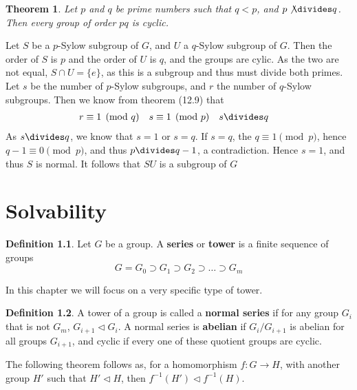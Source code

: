\documentclass[12pt]{amsbook}
\makeatletter
\theoremstyle{plain}
\newtheorem{theorem}{Theorem}[chapter]
\theoremstyle{definition}
\newtheorem{definition}{Definition}
\renewenvironment{proof}[1][\proofname]{\par
  \pushQED{\qed}%
  \normalfont \topsep6\p@\@plus6\p@\relax
  \list{}{\leftmargin=0em
          \rightmargin=\leftmargin
          \settowidth{\itemindent}{\itshape#1}%
          \labelwidth=\itemindent}

  \item[\hskip\labelsep
        \itshape
    #1\@addpunct{.}]\ignorespaces
}{%
  \popQED\endlist\@endpefalse
}
\makeatother
\begin{document}
\begin{theorem}
    Let $p$ and $q$ be prime numbers such that $q < p$, and $p \not \divides q$. Then every group of order $pq$ is cyclic.
\end{theorem}
\begin{proof}
    Let $S$ be a $p$-Sylow subgroup of $G$, and $U$ a $q$-Sylow subgroup of $G$. Then the order of $S$ is $p$ and the order of $U$ is $q$, and the groups are cylic. As the two are not equal, $S \cap U = \{ e \}$, as this is a subgroup and thus must divide both primes. Let $s$ be the number of $p$-Sylow subgroups, and $r$ the number of $q$-Sylow subgroups. Then we know from theorem (12.9) that
    \begin{align*} r &\equiv 1 \pmod{q} & s &\equiv 1 \pmod{p} & s &\divides q \end{align*}
    As $s \divides q$, we know that $s = 1$ or $s = q$. If $s = q$, the $q \equiv 1 \pmod{p}$, hence $q-1 \equiv 0 \pmod{p}$, and thus $p \divides q-1$, a contradiction. Hence $s = 1$, and thus $S$ is normal. It follows that $SU$ is a subgroup of $G$ 
\end{proof}










\chapter{Solvability}

\begin{definition}
    Let $G$ be a group. A {\bf series}  or {\bf tower}  is a finite sequence of groups
    \[ G = G_0 \supset G_1 \supset G_2 \supset \dots \supset G_m \]
\end{definition}

In this chapter we will focus on a very specific type of tower.

\begin{definition}
    A tower of a group is called a {\bf normal series}  if for any group $G_i$ that is not $G_m$, $G_{i+1} \lhd G_{i}$. A normal series is {\bf abelian}  if $G_{i}/G_{i+1}$ is abelian for all groups $G_{i+1}$, and cyclic  if every one of these quotient groups are cyclic.
\end{definition}

The following theorem follows as, for a homomorphism $f:G \to H$, with another group $H'$ such that $H' \lhd H$, then $f^{-1}(H') \lhd f^{-1}(H)$.
\end{document}
